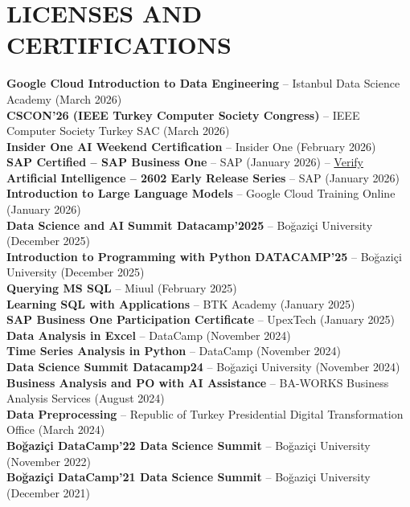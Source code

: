 \documentclass[a4paper,8pt]{article}
\begin{document}
\section{LICENSES AND CERTIFICATIONS}
{\small
\textbf{Google Cloud Introduction to Data Engineering} -- Istanbul Data Science Academy (March 2026)\\
\textbf{CSCON'26 (IEEE Turkey Computer Society Congress)} -- IEEE Computer Society Turkey SAC (March 2026)\\
\textbf{Insider One AI Weekend Certification} -- Insider One (February 2026)\\
\textbf{SAP Certified -- SAP Business One} -- SAP (January 2026) -- \href{https://www.credly.com/badges/149da554-e1b6-477d-a063-f3c7997625c2/linked_in_profile}{Verify}\\
\textbf{Artificial Intelligence -- 2602 Early Release Series} -- SAP (January 2026)\\
\textbf{Introduction to Large Language Models} -- Google Cloud Training Online (January 2026)\\
\textbf{Data Science and AI Summit Datacamp'2025} -- Boğaziçi University (December 2025)\\
\textbf{Introduction to Programming with Python DATACAMP'25} -- Boğaziçi University (December 2025)\\
\textbf{Querying MS SQL} -- Miuul (February 2025)\\
\textbf{Learning SQL with Applications} -- BTK Academy (January 2025)\\
\textbf{SAP Business One Participation Certificate} -- UpexTech (January 2025)\\
\textbf{Data Analysis in Excel} -- DataCamp (November 2024)\\
\textbf{Time Series Analysis in Python} -- DataCamp (November 2024)\\
\textbf{Data Science Summit Datacamp24} -- Boğaziçi University (November 2024)\\
\textbf{Business Analysis and PO with AI Assistance} -- BA-WORKS Business Analysis Services (August 2024)\\
\textbf{Data Preprocessing} -- Republic of Turkey Presidential Digital Transformation Office (March 2024)\\
\textbf{Boğaziçi DataCamp'22 Data Science Summit} -- Boğaziçi University (November 2022)\\
\textbf{Boğaziçi DataCamp'21 Data Science Summit} -- Boğaziçi University (December 2021)
}

\end{document}
